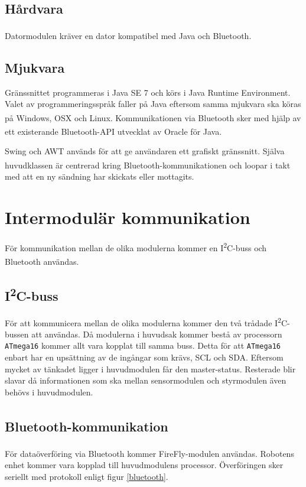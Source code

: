 \documentclass[11pt]{article}
\begin{document}
\begin{flushleft}
\subsection{Hårdvara}
Datormodulen kräver en dator kompatibel med Java och Bluetooth\textsuperscript{\circledR}. 

\subsection{Mjukvara}
Gränssnittet programmeras i Java SE 7 och körs i Java Runtime Environment. Valet av programmeringsspråk faller på Java eftersom samma mjukvara ska köras på Windows, OSX och Linux. Kommunikationen via Bluetooth\textsuperscript{\circledR} sker med hjälp av ett existerande Bluetooth\textsuperscript{\circledR}-API utvecklat av Oracle för Java. 

Swing och AWT används för att ge användaren ett grafiskt gränssnitt. Själva huvudklassen är centrerad kring Bluetooth\textsuperscript{\circledR}-kommunikationen och loopar i takt med att en ny sändning har skickats eller mottagits. 

\pagebreak
\section{Intermodulär kommunikation}\label{Intermodulär kommunikation}
För kommunikation mellan de olika modulerna kommer en I\textsuperscript{2}C-buss och Bluetooth\textsuperscript{\circledR} användas. 

\subsection{I\textsuperscript{2}C-buss}
För att kommunicera mellan de olika modulerna kommer den två trådade I\textsuperscript{2}C-bussen att användas. Då modulerna i huvudsak kommer bestå av processorn \verb+ATmega16+ kommer allt vara kopplat till samma buss. Detta för att \verb+ATmega16+ enbart har en upsättning av de ingångar som krävs, SCL och SDA. Eftersom mycket av tänkadet ligger i huvudmodulen får den master-status. Resterade blir slavar då informationen som ska mellan sensormodulen och styrmodulen även behövs i huvudmodulen.

\subsection{Bluetooth\textsuperscript{\circledR}-kommunikation}
För dataöverföring via Bluetooth\textsuperscript{\circledR} kommer FireFly-modulen användas. Robotens enhet kommer vara kopplad till huvudmodulens processor. Överföringen sker seriellt med protokoll enligt figur \ref{bluetooth}.


\end{flushleft}
\end{document}
